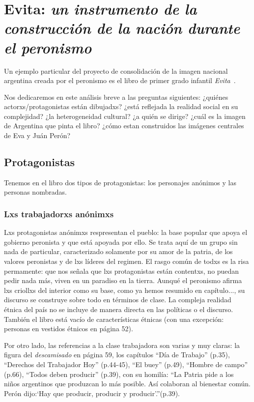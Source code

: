 \section{Evita: \emph{un instrumento de la construcción de la nación durante el peronismo}}

Un ejemplo particular del proyecto de consolidación de la imagen nacional argentina creada por el peronismo es el libro de primer grado infantil \textit{Evita}~\autocite{Albornoz1952}.

Nos dedicaremos en este análisis breve a las preguntas siguientes:
¿quiénes actorxs/protagonistas están dibujadxs?
¿está reflejada la realidad social en su complejidad?
¿la heterogeneidad cultural?
¿a quién se dirige?
¿cuál es la imagen de Argentina que pinta el libro?
¿cómo estan construidos las imágenes centrales de Eva y Juán Perón?

\subsection{Protagonistas}

Tenemos en el libro dos tipos de protagonistas: los personajes anónimos y las personas nombradas.

\subsubsection{Lxs trabajadorxs anónimxs}
Lxs protagonistas anónimxs respresentan el pueblo: la base popular que apoya el gobierno peronista y que está apoyada por ello.
Se trata aquí de un grupo sin nada de particular, caracterizado solamente por su amor de la patria, de los valores peronistas y de lxs líderes del regimen.
El rasgo común de todxs es la risa permamente: que nos señala que lxs protagonistas están contentxs, no puedan pedir nada más, viven en un paradiso en la tierra.
Aunqué el peronismo afirma lxs criollxs del interior como su base, como ya hemos resumido en capítulo..., su discurso se construye sobre todo en términos de clase.
La compleja realidad étnica del país no se incluye de manera directa en las políticas o el discurso.
También el libro está vacío de características étnicas (con una excepción: personas en vestidos étnicos en página 52).

Por otro lado, las referencias a la clase trabajadora son varias y muy claras:
la figura del \textit{descamisado} en página 59, los capítulos ``Día de Trabajo'' (p.35), ``Derechos del Trabajador Hoy'' (p.44-45), ``El buey'' (p.49), ``Hombre de campo'' (p.66), ``Todos deben producir'' (p.39),
con su homilía:
``La Patria pide a los niños argentinos que produzcan lo más posible. Así colaboran al bienestar común. Perón dijo:`Hay que producir, producir y producir'.''(p.39).

